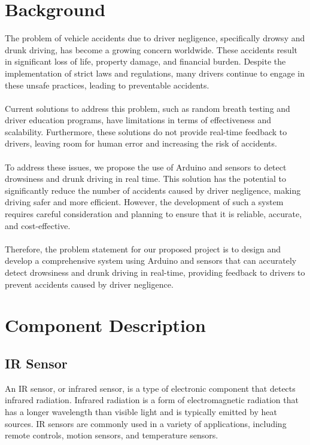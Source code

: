 \documentclass[12pt]{article}
\begin{document}
\section{Background}
The problem of vehicle accidents due to driver negligence, specifically drowsy and drunk driving, has become a growing concern worldwide. These accidents result in significant loss of life, property damage, and financial burden. Despite the implementation of strict laws and regulations, many drivers continue to engage in these unsafe practices, leading to preventable accidents.
\\
\\
Current solutions to address this problem, such as random breath testing and driver education programs, have limitations in terms of effectiveness and scalability. Furthermore, these solutions do not provide real-time feedback to drivers, leaving room for human error and increasing the risk of accidents.
\\
\\
To address these issues, we propose the use of Arduino and sensors to detect drowsiness and drunk driving in real time. This solution has the potential to significantly reduce the number of accidents caused by driver negligence, making driving safer and more efficient. However, the development of such a system requires careful consideration and planning to ensure that it is reliable, accurate, and cost-effective.
\\ 
\\
Therefore, the problem statement for our proposed project is to design and develop a comprehensive system using Arduino and sensors that can accurately detect drowsiness and drunk driving in real-time, providing feedback to drivers to prevent accidents caused by driver negligence.

\section{Component Description}

\subsection{IR Sensor}
An IR sensor, or infrared sensor, is a type of electronic component that detects infrared radiation. Infrared radiation is a form of electromagnetic radiation that has a longer wavelength than visible light and is typically emitted by heat sources. IR sensors are commonly used in a variety of applications, including remote controls, motion sensors, and temperature sensors.
\\    
\\
\end{document}
